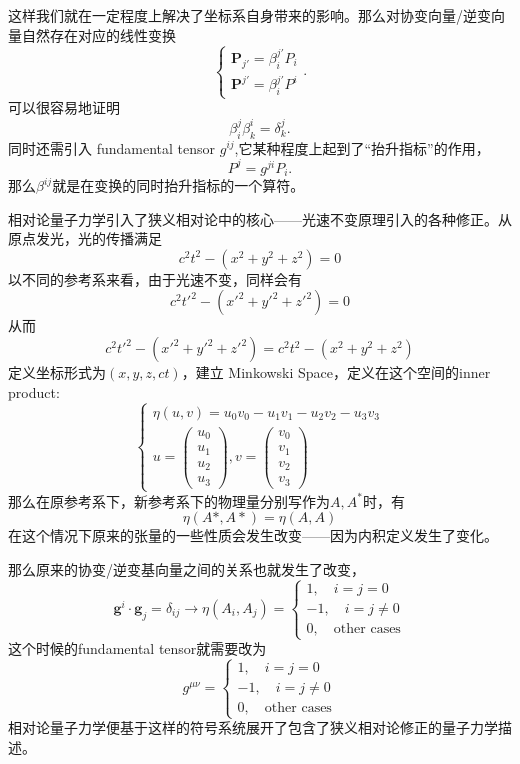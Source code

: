 \documentclass[12pt,a4paper,openany,twoside]{book}
\numberwithin{equation}{section}
\begin{document}
这样我们就在一定程度上解决了坐标系自身带来的影响。那么对协变向量/逆变向量自然存在对应的线性变换
\[
\begin{cases}
	\mathbf{P}_{j'} = \beta^{j'}_i P_i \\
	\mathbf{P}^{j'} = \beta^{j'}_i P^i
\end{cases}
.\] 
可以很容易地证明
\[
\beta^j_i \beta^i_k = \delta^j_k
.\]
同时还需引入 fundamental tensor $g^{ij}$,它某种程度上起到了``抬升指标''的作用，
 \[
	 P^j = g^{ji} P_i
.\] 
那么$\beta^{ij}$就是在变换的同时抬升指标的一个算符。

相对论量子力学引入了狭义相对论中的核心——光速不变原理引入的各种修正。从原点发光，光的传播满足
\begin{equation}
	c^2 t^2 -(x^2 + y^2 + z^2 ) =0
\end{equation}
以不同的参考系来看，由于光速不变，同样会有
\begin{equation}
 c^2 t'^2 -(x'^2 + y'^2 + z'^2)=0
\end{equation}
从而
\begin{equation}
c^2 t'^2 -(x'^2 + y'^2 + z'^2) = c^2 t^2 -(x^2 + y^2 + z^2 )
\end{equation}
定义坐标形式为$(x,y,z,ct)$，建立 Minkowski Space，定义在这个空间的inner product:
\begin{equation}
\begin{cases}
	\eta(u,v) = u_0 v_0 - u_1 v_1 - u_2 v_2 - u_3 v_3\\
	u=\begin{pmatrix}
	u_0 \\ u_1 \\ u_2 \\u_3
	\end{pmatrix},
	v=\begin{pmatrix}
	v_0 \\ v_1 \\ v_2 \\v_3
	\end{pmatrix}
\end{cases}
\end{equation}
那么在原参考系下，新参考系下的物理量分别写作为$A,A^*$时，有
\begin{equation}
	\eta(A*,A*)=\eta(A,A)
\end{equation}
在这个情况下原来的张量的一些性质会发生改变——因为内积定义发生了变化。

那么原来的协变/逆变基向量之间的关系也就发生了改变，
\begin{equation}
	\mathbf{g}^i \cdot \mathbf{g}_j = \delta_{ij} \rightarrow \eta(A_i,A_j) =
	\begin{cases}
	1,\quad i=j=0\\
	-1,\quad i=j\neq 0 \\
	0,\quad \text{other cases}
	\end{cases}
\end{equation}
这个时候的fundamental tensor就需要改为
\begin{equation}
	g^{\mu\nu} =
	\begin{cases}
	1,\quad i=j=0\\
	-1,\quad i=j\neq 0 \\
	0,\quad \text{other cases}
	\end{cases}
\end{equation}
相对论量子力学便基于这样的符号系统展开了包含了狭义相对论修正的量子力学描述。
\end{document}
